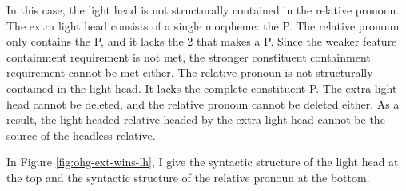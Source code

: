 In this case, the light head is not structurally contained in the relative pronoun.
The extra light head consists of a single morpheme: the P.
The relative pronoun only contains the P, and it lacks the 2 that makes a P. Since the weaker feature containment requirement is not met, the stronger constituent containment requirement cannot be met either.
The relative pronoun is not structurally contained in the light head. It lacks the complete constituent P.
The extra light head cannot be deleted, and the relative pronoun cannot be deleted either.
As a result, the light-headed relative headed by the extra light head cannot be the source of the headless relative.

In Figure \ref{fig:ohg-ext-wins-lh}, I give the syntactic structure of the light head at the top and the syntactic structure of the relative pronoun at the bottom.

